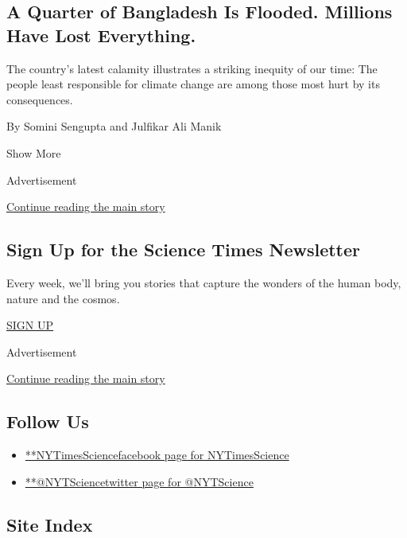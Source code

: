 \begin{enumerate}
  \hypertarget{a-quarter-of-bangladesh-is-flooded-millions-have-lost-everything}{%
  \subsection{A Quarter of Bangladesh Is Flooded. Millions Have Lost
  Everything.}\label{a-quarter-of-bangladesh-is-flooded-millions-have-lost-everything}}

  The country's latest calamity illustrates a striking inequity of our
  time: The people least responsible for climate change are among those
  most hurt by its consequences.

  By Somini Sengupta and Julfikar Ali Manik
\end{enumerate}

Show More

Advertisement

\protect\hyperlink{after-mid2}{Continue reading the main story}

\hypertarget{sign-up-for-the-science-times-newsletter}{%
\subsection{Sign Up for the Science Times
Newsletter}\label{sign-up-for-the-science-times-newsletter}}

Every week, we'll bring you stories that capture the wonders of the
human body, nature and the cosmos.

\href{/newsletters/signup/SC}{SIGN UP}

Advertisement

\protect\hyperlink{after-mktg}{Continue reading the main story}

\hypertarget{follow-us}{%
\subsection{Follow Us}\label{follow-us}}

\begin{itemize}
\tightlist
\item
  \href{https://www.facebookcorewwwi.onion/NYTimesScience}{**NYTimesSciencefacebook
  page for NYTimesScience}
\item
  \href{https://twitter.com/NYTScience}{**@NYTSciencetwitter page for
  @NYTScience}
\end{itemize}

\hypertarget{site-index}{%
\subsection{Site Index}\label{site-index}}

